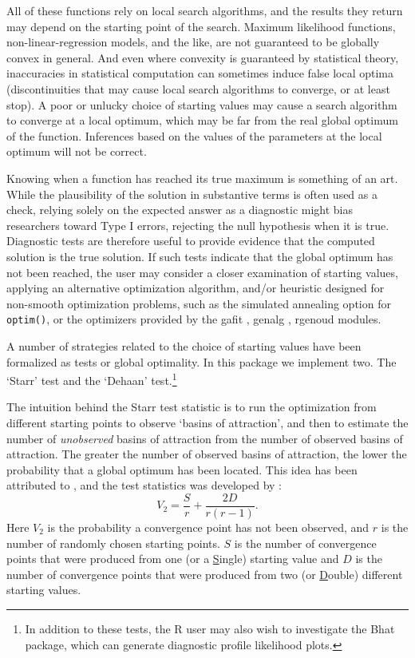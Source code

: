 \documentclass[11pt]{article}
\let\code=\texttt
\let\proglang=\textsf
\newcommand{\pkg}[1]{{\normalfont\fontseries{b}\selectfont #1}}
\begin{document}
All of these functions rely on local search algorithms, and the results they
return may depend on the starting point of the search. Maximum likelihood functions, non-linear-regression models, and the like, are not guaranteed to 
be globally convex in general. And even where convexity is guaranteed by statistical theory, inaccuracies in statistical computation can sometimes induce false local optima (discontinuities that may cause local search algorithms to converge, or at least stop). A poor or unlucky choice of starting values may cause a search algorithm to converge at a local optimum, which may be far from the real global optimum of the function. Inferences based on the values of the parameters at the local optimum will not be correct. 

Knowing when a function has reached its true maximum is
something of an art. While the plausibility of the solution
in substantive terms is often used as a check, relying solely on the expected
answer as a diagnostic might bias researchers toward Type I errors, rejecting the null hypothesis when it is true. Diagnostic
tests are therefore useful to provide evidence that the computed
solution is the true solution. If such tests indicate that the global optimum has not been reached, the user may consider a closer examination of starting values, applying an alternative optimization algorithm, and/or heuristic designed for non-smooth optimization problems, such as the simulated annealing option for \code{optim()}, or the optimizers provided by the \pkg{gafit} \citep{gafit02}, \pkg{genalg} \citep{genalg05}, \pkg{rgenoud}  \citep{rgenoud07} modules.

A number of strategies related to the choice of starting values have been formalized as tests 
or global optimality. In this package we implement two. The `Starr' test and the `Dehaan' 
	test.\footnote{In addition to these tests, the \proglang{R} user may also wish to 
	investigate the \pkg{Bhat} \citep{bhat05} package, which can generate diagnostic profile likelihood 
	plots.} 
 
The intuition behind the Starr test statistic is to run the optimization from 
different starting points to observe `basins of attraction', and then to
estimate the number of \emph{unobserved} basins of attraction from the
number of observed basins of attraction. The greater the number
of observed basins of attraction, the lower the probability that a
global optimum has been located. This idea has been attributed to \citet{Turing48},
and the test statistics was developed by \citet{Starr79}:
\begin{equation}\label{Starr.test.equation}
    V_{2}=\frac{S}{r}+\frac{2D}{r\left( r-1\right)}.
\end{equation} Here $V_2$ is the probability a convergence
point has not been observed, and $r$ is the number of randomly
chosen starting points. $S$ is the number of convergence points
that were produced from one (or a {\underline{S}}ingle) starting
value and $D$ is the number of convergence points that were
produced from two (or {\underline{D}}ouble) different starting
values. 
\end{document}

